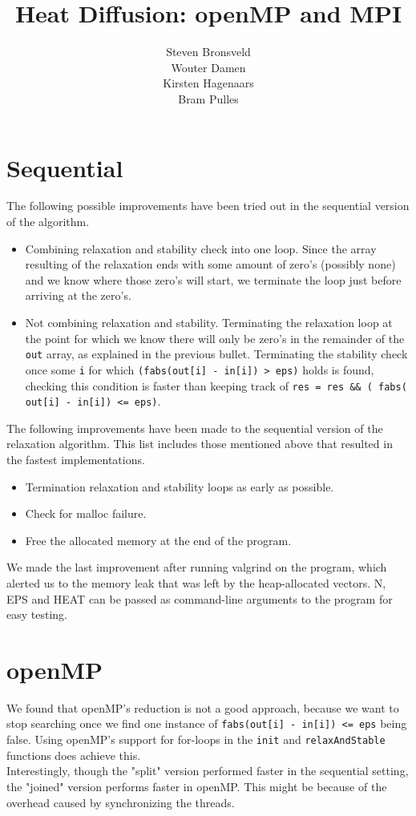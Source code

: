 \documentclass[a4paper]{article}
\author{Steven Bronsveld\\Wouter Damen\\Kirsten Hagenaars\\Bram Pulles}
\title{\textbf{Heat Diffusion: openMP and MPI}}
\begin{document}
\maketitle

\tableofcontents

\pagebreak
\section{Sequential}
The following possible improvements have been tried out in the sequential version of the algorithm.
\begin{itemize}
    \item Combining relaxation and stability check into one loop. Since the array resulting of the relaxation ends with some amount of zero's (possibly none) and we know where those zero's will start, we terminate the loop just before arriving at the zero's.
    \item Not combining relaxation and stability. Terminating the relaxation loop at the point for which we know there will only be zero's in the remainder of the \texttt{out} array, as explained in the previous bullet. Terminating the stability check once some \texttt{i} for which \texttt{(fabs(out[i] - in[i]) > eps)} holds is found, checking this condition is faster than keeping track of \texttt{res = res \&\& ( fabs( out[i] - in[i]) <= eps)}.
\end{itemize}
The following improvements have been made to the sequential version of the relaxation algorithm. This list includes those mentioned above that resulted in the fastest implementations.
\begin{itemize}
    \item Termination relaxation and stability loops as early as possible.
    \item Check for malloc failure.
    \item Free the allocated memory at the end of the program.
\end{itemize}
We made the last improvement after running valgrind on the program, which alerted us to the memory leak that was left by the heap-allocated vectors. 
N, EPS and HEAT can be passed as command-line arguments to the program for easy testing.

\section{openMP}

We found that openMP's reduction is not a good approach, because we want to stop searching once we find one instance of \texttt{fabs(out[i] - in[i]) <= eps} being false. Using openMP's support for for-loops in the \texttt{init} and \texttt{relaxAndStable} functions does achieve this.\\
Interestingly, though the "split" version performed faster in the sequential setting, the "joined" version performs faster in openMP. 
This might be because of the overhead caused by synchronizing the threads.
\end{document}
